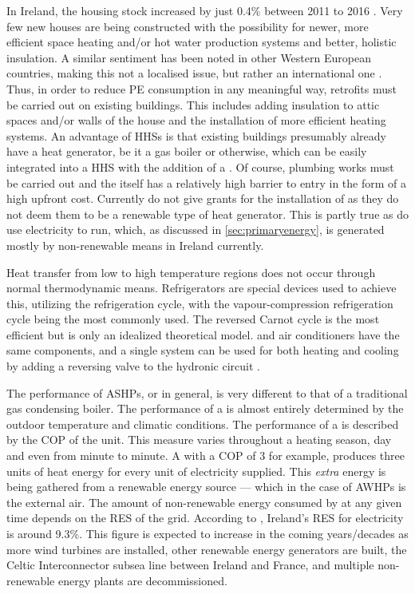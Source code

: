 In Ireland, the housing stock increased by just 0.4\% between 2011 to 2016 \cite{cso_2020}. Very few new houses are being constructed with the possibility for newer, more efficient space heating and/or hot water production systems and better, holistic insulation. A similar sentiment has been noted in other Western European countries, making this not a localised issue, but rather an international one \cite{klein_numerical_2014, dongellini_influence_2021}. Thus, in order to reduce \ac{PE} consumption in any meaningful way, retrofits must be carried out on existing buildings. This includes adding insulation to attic spaces and/or walls of the house and the installation of more efficient heating systems. An advantage of \acp{HHS} is that existing buildings presumably already have a heat generator, be it a gas boiler or otherwise, which can be easily integrated into a \ac{HHS} with the addition of a \HP. Of course, plumbing works must be carried out and the \HP itself has a relatively high barrier to entry in the form of a high upfront cost. Currently  do not give grants for the installation of \HPs as they do not deem them to be a renewable type of heat generator. This is partly true as \HPs do use electricity to run, which, as discussed in \cref{sec:primaryenergy}, is generated mostly by non-renewable means in Ireland currently.  

Heat transfer from low to high temperature regions does not occur through normal thermodynamic means. Refrigerators are special devices used to achieve this, utilizing the refrigeration cycle, with the vapour-compression refrigeration cycle being the most commonly used. The reversed Carnot cycle is the most efficient but is only an idealized theoretical model. \HPs and air conditioners have the same components, and a single system can be used for both heating and cooling by adding a reversing valve to the hydronic circuit \cite{cengel_thermo_2020}.

The performance of \acp{ASHP}, or \HPs in general, is very different to that of a traditional gas condensing boiler. The performance of a \HP is almost entirely determined by the outdoor temperature and climatic conditions. The performance of a \HP is described by the \ac{COP} of the unit. This measure varies throughout a heating season, day and even from minute to minute. A \HP with a \ac{COP} of 3 for example, produces three units of heat energy for every unit of electricity supplied. This \textit{extra} energy is being gathered from a renewable energy source --- which in the case of \acp{AWHP} is the external air. The amount of non-renewable energy consumed by \HP at any given time depends on the \ac{RES} of the grid. According to , Ireland's \ac{RES} for electricity is around 9.3\%. This figure is expected to increase in the coming years/decades as more wind turbines are installed, other renewable energy generators are built, the Celtic Interconnector subsea line between Ireland and France, and multiple non-renewable energy plants are decommissioned.


